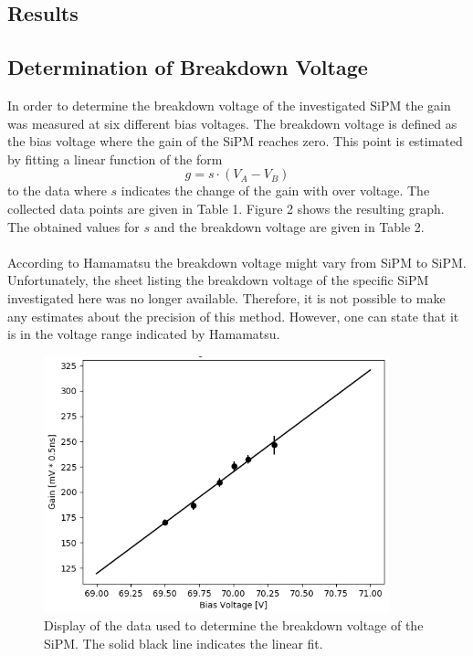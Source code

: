 \documentclass[10pt,a4paper]{article}
\begin{document}
\begin{multicols}{2}
\section{Results}

\subsection{Determination of Breakdown Voltage}
In order to determine the breakdown voltage of the investigated SiPM the gain was measured at six different bias voltages. The breakdown voltage is defined as the bias voltage where the gain of the SiPM reaches zero. This point is estimated by fitting a linear function of the form
\begin{equation}
g = s \cdot (V_A-V_B)
\end{equation}
to the data where $s$ indicates the change of the gain with over voltage. The collected data points are given in Table 1. Figure 2 shows the resulting graph. The obtained values for $s$ and the breakdown voltage are given in Table 2. \\ \\  \noindent 
According to Hamamatsu the breakdown voltage might vary from SiPM to SiPM. Unfortunately, the sheet listing the breakdown voltage of the specific SiPM investigated here was no longer available. Therefore, it is not possible to make any estimates about the precision of this method. However, one can state that it is in the voltage range indicated by Hamamatsu.

\end{multicols}
\begin{figure}[H]
\centering
\includegraphics[width=10cm]{Breakdown}
\caption{Display of the data used to determine the breakdown voltage of the SiPM. The solid black line indicates the linear fit.}
\label{fig3}
\end{figure}
\end{document}
